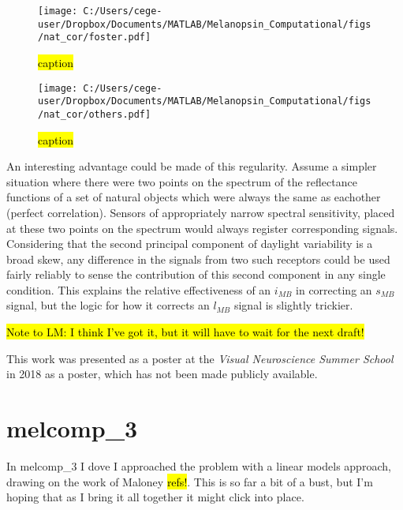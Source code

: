 \begin{figure}[h]
    \centering
    \texttt{[image: C:/Users/cege-user/Dropbox/Documents/MATLAB/Melanopsin\_Computational/figs/nat\_cor/foster.pdf]}
    \caption{\hl{caption}}
    \label{fig:foster}
\end{figure} 

\begin{figure}[h]
    \centering
    \texttt{[image: C:/Users/cege-user/Dropbox/Documents/MATLAB/Melanopsin\_Computational/figs/nat\_cor/others.pdf]}
    \caption{\hl{caption}}
    \label{fig:others}
\end{figure} 

An interesting advantage could be made of this regularity. Assume a simpler situation where there were two points on the spectrum of the reflectance functions of a set of natural objects which were always the same as eachother (perfect correlation). Sensors of appropriately narrow spectral sensitivity, placed at these two points on the spectrum would always register corresponding signals. Considering that the second principal component of daylight variability is a broad skew, any difference in the signals from two such receptors could be used fairly reliably to sense the contribution of this second component in any single condition. This explains the relative effectiveness of an $i_{MB}$ in correcting an $s_{MB}$ signal, but the logic for how it corrects an $l_{MB}$ signal is slightly trickier.

\hl{Note to LM: I think I've got it, but it will have to wait for the next draft!}

This work was presented as a poster at the \emph{Visual Neuroscience Summer School} in 2018 as a poster, which has not been made publicly available.

\section{melcomp\_3}

In melcomp\_3 I dove I approached the problem with a linear models approach, drawing on the work of Maloney \hl{refs!}. This is so far a bit of a bust, but I'm hoping that as I bring it all together it might click into place.


